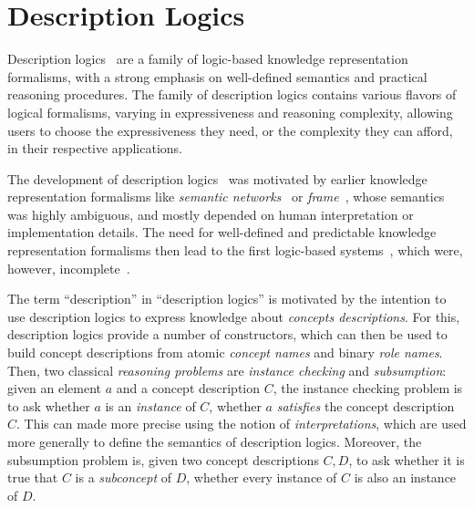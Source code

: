 
\section{Description Logics}
\label{sec:repr-knowl-using}

Description logics~\cite{DLhandbook} are a family of logic-based knowledge representation
formalisms, with a strong emphasis on well-defined semantics and practical reasoning
procedures.  The family of description logics contains various flavors of logical
formalisms, varying in expressiveness and reasoning complexity, allowing users to choose
the expressiveness they need, or the complexity they can afford, in their respective
applications.

The development of description logics~\cite{journals/sLogica/BaaderS01} was motivated by
earlier knowledge representation formalisms like \emph{semantic
  networks}~\cite{SemanticNetworks} or \emph{frame}~\cite{Minsky-Frames}, whose semantics
was highly ambiguous, and mostly depended on human interpretation or implementation
details.  The need for well-defined and predictable knowledge representation formalisms
then lead to the first logic-based systems~\cite{journals/cogsci/BrachmanS85}, which were,
however, incomplete~\cite{conf/kr/Schmidt-Schauss89}.

The term \enquote{description} in \enquote{description logics} is motivated by the
intention to use description logics to express knowledge about \emph{concepts
  descriptions}.  For this, description logics provide a number of constructors, which can
then be used to build concept descriptions from atomic \emph{concept names} and binary
\emph{role names}.  Then, two classical \emph{reasoning problems} are \emph{instance
  checking} and \emph{subsumption}: given an element $a$ and a concept description $C$,
the instance checking problem is to ask whether $a$ is an \emph{instance} of $C$, \ie
whether $a$ \emph{satisfies} the concept description $C$.  This can made more precise
using the notion of \emph{interpretations}, which are used more generally to define the
semantics of description logics.  Moreover, the subsumption problem is, given two concept
descriptions $C, D$, to ask whether it is true that $C$ is a \emph{subconcept} of $D$, \ie
whether every instance of $C$ is also an instance of $D$.

